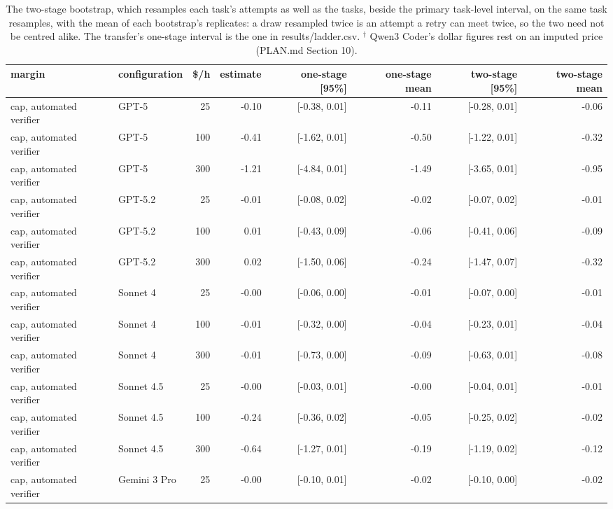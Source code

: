 \begin{table}[t]
\centering
\small
\caption{The two-stage bootstrap, which resamples each task's attempts as well as the tasks, beside the primary task-level interval, on the same task resamples, with the mean of each bootstrap's replicates: a draw resampled twice is an attempt a retry can meet twice, so the two need not be centred alike. The transfer's one-stage interval is the one in results/ladder.csv. $^\dagger$ Qwen3 Coder's dollar figures rest on an imputed price (PLAN.md Section 10).}
\label{tab:tableA3_two_stage}
\begin{tabular}{llrrrrrr}
\toprule
margin & configuration & \$/h & estimate & one-stage [95\%] & one-stage mean & two-stage [95\%] & two-stage mean \\
\midrule
cap, automated verifier & GPT-5 & 25 & -0.10 & [-0.38, 0.01] & -0.11 & [-0.28, 0.01] & -0.06 \\
cap, automated verifier & GPT-5 & 100 & -0.41 & [-1.62, 0.01] & -0.50 & [-1.22, 0.01] & -0.32 \\
cap, automated verifier & GPT-5 & 300 & -1.21 & [-4.84, 0.01] & -1.49 & [-3.65, 0.01] & -0.95 \\
cap, automated verifier & GPT-5.2 & 25 & -0.01 & [-0.08, 0.02] & -0.02 & [-0.07, 0.02] & -0.01 \\
cap, automated verifier & GPT-5.2 & 100 & 0.01 & [-0.43, 0.09] & -0.06 & [-0.41, 0.06] & -0.09 \\
cap, automated verifier & GPT-5.2 & 300 & 0.02 & [-1.50, 0.06] & -0.24 & [-1.47, 0.07] & -0.32 \\
cap, automated verifier & Sonnet 4 & 25 & -0.00 & [-0.06, 0.00] & -0.01 & [-0.07, 0.00] & -0.01 \\
cap, automated verifier & Sonnet 4 & 100 & -0.01 & [-0.32, 0.00] & -0.04 & [-0.23, 0.01] & -0.04 \\
cap, automated verifier & Sonnet 4 & 300 & -0.01 & [-0.73, 0.00] & -0.09 & [-0.63, 0.01] & -0.08 \\
cap, automated verifier & Sonnet 4.5 & 25 & -0.00 & [-0.03, 0.01] & -0.00 & [-0.04, 0.01] & -0.01 \\
cap, automated verifier & Sonnet 4.5 & 100 & -0.24 & [-0.36, 0.02] & -0.05 & [-0.25, 0.02] & -0.02 \\
cap, automated verifier & Sonnet 4.5 & 300 & -0.64 & [-1.27, 0.01] & -0.19 & [-1.19, 0.02] & -0.12 \\
cap, automated verifier & Gemini 3 Pro & 25 & -0.00 & [-0.10, 0.01] & -0.02 & [-0.10, 0.00] & -0.02 \\

\end{tabular}
\end{table}
